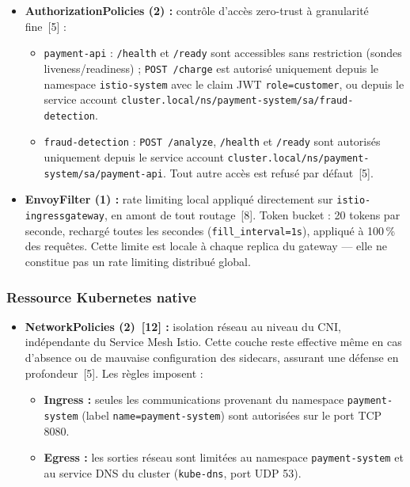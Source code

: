 \begin{itemize}[topsep=4pt, itemsep=6pt]
  \item \textbf{AuthorizationPolicies (2) :} contrôle d'accès zero-trust à
        granularité fine~[5] :
        \begin{itemize}[topsep=2pt, itemsep=2pt]
          \item \texttt{payment-api} : \texttt{/health} et \texttt{/ready} sont
                accessibles sans restriction (sondes liveness/readiness) ;
                \texttt{POST /charge} est autorisé uniquement depuis le namespace
                \texttt{istio-system} avec le claim JWT \texttt{role=customer},
                ou depuis le service account
                \texttt{cluster.local/ns/payment-system/sa/fraud-detection}.
          \item \texttt{fraud-detection} : \texttt{POST /analyze},
                \texttt{/health} et \texttt{/ready} sont autorisés uniquement
                depuis le service account
                \texttt{cluster.local/ns/payment-system/sa/payment-api}. Tout
                autre accès est refusé par défaut~[5].
        \end{itemize}

  \item \textbf{EnvoyFilter (1) :} rate limiting local appliqué directement sur
        \texttt{istio-ingressgateway}, en amont de tout routage~[8]. Token bucket
        : 20 tokens par seconde, rechargé toutes les secondes
        (\texttt{fill\_interval=1s}), appliqué à 100\,\% des requêtes. Cette
        limite est locale à chaque replica du gateway --- elle ne constitue pas
        un rate limiting distribué global.

\end{itemize}

\subsubsection*{Ressource Kubernetes native}

\begin{itemize}[topsep=4pt, itemsep=3pt]
  \item \textbf{NetworkPolicies (2)~[12] :} isolation réseau au niveau du CNI,
        indépendante du Service Mesh Istio. Cette couche reste effective même en
        cas d'absence ou de mauvaise configuration des sidecars, assurant une
        défense en profondeur~[5]. Les règles imposent :
        \begin{itemize}[topsep=2pt, itemsep=2pt]
          \item \textbf{Ingress :} seules les communications provenant du
                namespace \texttt{payment-system} (label
                \texttt{name=payment-system}) sont autorisées sur le port TCP
                8080.
          \item \textbf{Egress :} les sorties réseau sont limitées au namespace
                \texttt{payment-system} et au service DNS du cluster
                (\texttt{kube-dns}, port UDP 53).
        \end{itemize}
\end{itemize}

